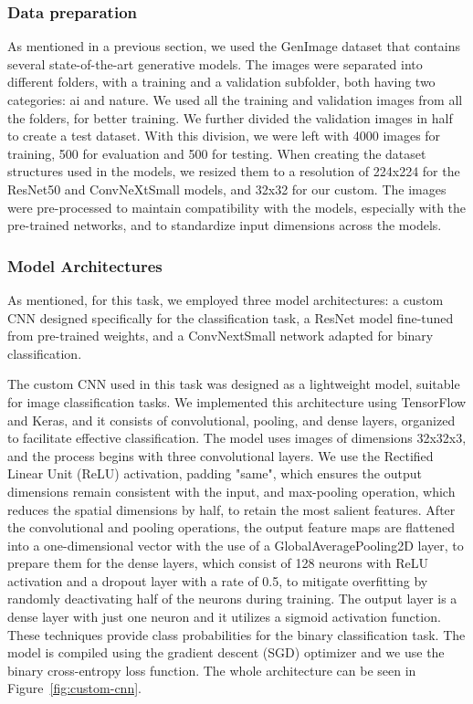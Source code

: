 \documentclass[runningheads]{llncs}
\begin{document}
\subsubsection{Data preparation} As mentioned in a previous section, we used the GenImage dataset that contains several state-of-the-art generative models. The images were separated into different folders, with a training and a validation subfolder, both having two categories: ai and nature. We used all the training and validation images from all the folders, for better training. We further divided the validation images in half to create a test dataset. With this division, we were left with 4000 images for training, 500 for evaluation and 500 for testing. When creating the dataset structures used in the models, we resized them to a resolution of 224x224 for the ResNet50 and ConvNeXtSmall models, and 32x32 for our custom. The images were pre-processed to maintain compatibility with the models, especially with the pre-trained networks, and to standardize input dimensions across the models.

\subsubsection{Model Architectures } As mentioned, for this task, we employed three model architectures:  a custom CNN designed specifically for the classification task, a ResNet model fine-tuned from pre-trained weights, and a ConvNextSmall network adapted for binary classification. 

The custom CNN used in this task was designed as a lightweight model, suitable for image classification tasks. We implemented this architecture using TensorFlow and Keras, and it consists of convolutional, pooling, and dense layers, organized to facilitate effective classification. The model uses images of dimensions 32x32x3, and the process begins with three convolutional layers. We use the Rectified Linear Unit (ReLU) activation, padding "same", which ensures the output dimensions remain consistent with the input, and max-pooling operation, which reduces the spatial dimensions by half, to retain the most salient features. After the convolutional and pooling operations, the output feature maps are flattened into a one-dimensional vector with the use of a GlobalAveragePooling2D layer, to prepare them for the dense layers, which consist of 128 neurons with ReLU activation and a dropout layer with a rate of 0.5, to mitigate overfitting by randomly deactivating half of the neurons during training. The output layer is a dense layer with just one neuron and it utilizes a sigmoid activation function. These techniques provide class probabilities for the binary classification task. The model is compiled using the gradient descent (SGD) optimizer and we use the binary cross-entropy loss function. The whole architecture can be seen in Figure~\ref{fig:custom-cnn}.
\end{document}
